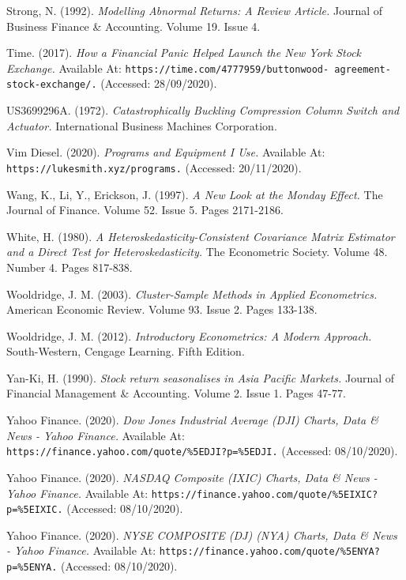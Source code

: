 \documentclass[11pt, english]{article}
\begin{document}
\begin{thebibliography}{9}
		Strong, N. (1992).
		\textsl{Modelling Abnormal Returns: A Review Article.}
		Journal of Business Finance \& Accounting. Volume 19. Issue 4.


		Time. (2017).
		\textsl{How a Financial Panic Helped Launch the New York Stock Exchange.}
		Available At:
		\texttt{https://time.com/4777959/buttonwood- agreement-stock-exchange/.}
		(Accessed: 28/09/2020).


		US3699296A. (1972).
		\textsl{Catastrophically Buckling Compression Column Switch and Actuator.}
		International Business Machines Corporation.


		Vim Diesel. (2020).
		\textsl{Programs and Equipment I Use.}
		Available At:
		\texttt{https://lukesmith.xyz/programs.}
		(Accessed: 20/11/2020).


		Wang, K., Li, Y., Erickson, J. (1997).
		\textsl{A New Look at the Monday Effect.}
		The Journal of Finance. Volume 52. Issue 5. Pages 2171-2186.

		White, H. (1980).
		\textsl{A Heteroskedasticity-Consistent Covariance Matrix Estimator and a Direct Test for Heteroskedasticity.}
		The Econometric Society. Volume 48. Number 4. Pages 817-838.

		Wooldridge, J. M. (2003).
		\textsl{Cluster-Sample Methods in Applied Econometrics.}
		American Economic Review. Volume 93. Issue 2. Pages 133-138.
	
		Wooldridge, J. M. (2012).
		\textsl{Introductory Econometrics: A Modern Approach.}
		South-Western, Cengage Learning. Fifth Edition.


		Yan-Ki, H. (1990).
		\textsl{Stock return seasonalises in Asia Pacific Markets.}
		Journal of Financial Management \& Accounting. Volume 2. Issue 1. Pages 47-77.
	
		Yahoo Finance. (2020).
		\textsl{Dow Jones Industrial Average (DJI) Charts, Data \& News - Yahoo Finance.}
		Available At:
		\texttt{https://finance.yahoo.com/quote/\%5EDJI?p=\%5EDJI.}
		(Accessed: 08/10/2020).

		Yahoo Finance. (2020).
		\textsl{NASDAQ Composite (IXIC) Charts, Data \& News - Yahoo Finance.}
		Available At:
		\texttt{https://finance.yahoo.com/quote/\%5EIXIC?p=\%5EIXIC.}
		(Accessed: 08/10/2020).

		Yahoo Finance. (2020).
		\textsl{NYSE COMPOSITE (DJ) (NYA) Charts, Data \& News - Yahoo Finance.}
		Available At:
		\texttt{https://finance.yahoo.com/quote/\%5ENYA?p=\%5ENYA.}
		(Accessed: 08/10/2020).

	\end{thebibliography}
\end{document}
